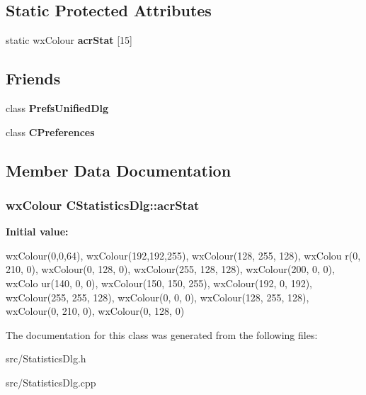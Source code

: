 \subsection*{Static Protected Attributes}
\begin{DoxyCompactItemize}
\item 
static wxColour {\bfseries acrStat} [15]
\end{DoxyCompactItemize}
\subsection*{Friends}
\begin{DoxyCompactItemize}
\item 
class {\bf PrefsUnifiedDlg}\label{classCStatisticsDlg_ac24ec000139eca6e3db54b6c0fa40c93}

\item 
class {\bf CPreferences}\label{classCStatisticsDlg_a22cb0cab0a8dc23af268bf7f5cf94806}

\end{DoxyCompactItemize}


\subsection{Member Data Documentation}
\subsubsection[{acrStat}]{\setlength{\rightskip}{0pt plus 5cm}wxColour CStatisticsDlg::acrStat\hspace{0.3cm}{\ttfamily  [static, protected]}}\label{classCStatisticsDlg_a3093af7dc1b24ba43124cbef2c8c75de}
{\bfseries Initial value:}
\begin{DoxyCode}

    { 
        wxColour(0,0,64), wxColour(192,192,255), wxColour(128, 255, 128), wxColou
      r(0, 210, 0),
        wxColour(0, 128, 0), wxColour(255, 128, 128), wxColour(200, 0, 0), wxColo
      ur(140, 0, 0),
        wxColour(150, 150, 255), wxColour(192, 0, 192), wxColour(255, 255, 128), 
      wxColour(0, 0, 0), 
        wxColour(128, 255, 128), wxColour(0, 210, 0), wxColour(0, 128, 0)
    }
\end{DoxyCode}


The documentation for this class was generated from the following files:\begin{DoxyCompactItemize}
\item 
src/StatisticsDlg.h\item 
src/StatisticsDlg.cpp\end{DoxyCompactItemize}
